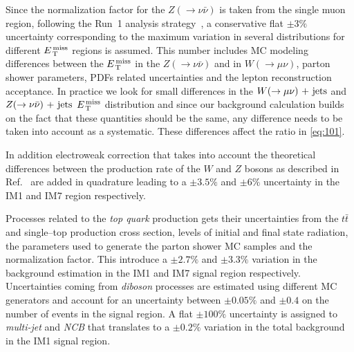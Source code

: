Since the normalization factor for the $Z(\rightarrow \nu \bar{\nu})$ is taken
from the single muon region, following the Run~1 analysis
strategy~\cite{RunIPaper}, a conservative flat $\pm 3\%$ uncertainty
corresponding to the maximum variation in several distributions for different
$E_\mathrm{\, T}^\mathrm{\, miss}$ regions is assumed. This number includes MC modeling differences between
the $E_\mathrm{\, T}^\mathrm{\, miss}$ in the $Z(\rightarrow \nu \bar{\nu})$ and in
$W(\rightarrow \mu \nu)$, parton shower parameters, PDFs related uncertainties
and the lepton reconstruction acceptance. In practice we look for small
differences in the $W (\rightarrow \mu \nu)\mathrm{~+~jets}$ and $Z (\rightarrow \nu \bar{\nu})\mathrm{~+~jets}$ $E_\mathrm{\, T}^\mathrm{\, miss}$ distribution and
since our background calculation builds on the fact that these quantities should
be the same, any difference needs to be taken into account as a
systematic. These differences affect the ratio in \cref{eq:101}.

In addition electroweak correction that takes into account the theoretical
differences between the production rate of the $W$ and $Z$ bosons as described
in Ref.~\cite{EWCorrections} are added in quadrature leading to a $\pm 3.5\%$
and $\pm 6\%$ uncertainty in the IM1 and IM7 region respectively.

Processes related to the \emph{top quark} production gets their uncertainties
from the $t \bar{t}$ and single--top production cross section, levels of initial
and final state radiation, the parameters used to generate the parton shower MC
samples and the normalization factor. This introduce a $\pm 2.7\%$ and
$\pm 3.3 \%$ variation in the background estimation in the IM1 and IM7 signal
region respectively. Uncertainties coming from \emph{diboson} processes are
estimated using different MC generators and account for an uncertainty between
$\pm 0.05\%$ and $\pm 0.4$ on the number of events in the signal region. A flat
$\pm 100\%$ uncertainty is assigned to \emph{multi-jet} and \emph{NCB} that
translates to a $\pm 0.2\%$ variation in the total background in the IM1 signal
region.
